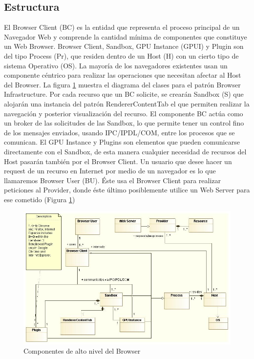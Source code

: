 \subsection{Estructura}
El Browser Client (BC) es la entidad que representa el proceso principal de un Navegador Web y comprende la cantidad mínima de componentes que constituye un Web Browser. Browser Client, Sandbox, GPU Instance (GPUI) y Plugin son del tipo Process (Pr), que residen dentro de un Host (H) con un cierto tipo de sistema Operativo (OS). La mayoría de los navegadores existentes usan un componente céntrico para realizar las operaciones que necesitan afectar al Host del Browser. La figura \ref{fig:BIPatt} muestra el diagrama del clases para el patrón Browser Infrastructure. Por cada recurso que un BC solicite, se crearán Sandbox (S) que alojarán una instancia del patrón RendererContentTab el que permiten realizar la navegación y posterior visualización del recurso.
El componente BC actúa como un broker de las solicitudes de las Sandbox, lo que permite tener un control fino de los mensajes enviados, usando IPC/IPDL/COM, entre los procesos que se comunican. El GPU Instance y Plugins son elementos que pueden comunicarse directamente con el Sandbox, de esta manera cualquier necesidad de recursos del Host pasarán también por el Browser Client. 
Un usuario que desee hacer un request de un recurso en Internet por medio de un navegador es lo que llamaremos Browser User (BU). Éste usa el Browser Client para realizar peticiones al Provider, donde éste último posiblemente utilice un Web Server para ese cometido (Figura \ref{fig:BIPatt})

	    \begin{figure}[h]
	        \centering
	        \includegraphics[scale=0.45]{figures/chap4/browserInfraPattern.jpg}
	        \caption{Componentes de alto nivel del Browser}
	        \label{fig:BIPatt}
	    \end{figure}

